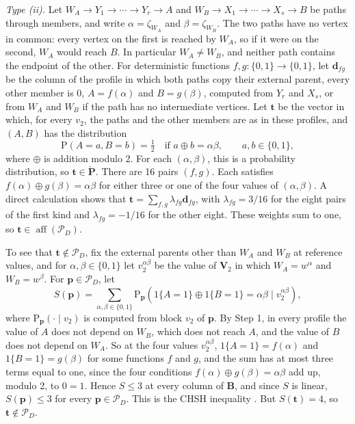 \documentclass[12pt]{article}
\def\Pr{{\mathrm{P}}}
\newcommand{\bV}{\boldsymbol{V}}
\begin{document}
\emph{Type (ii).} Let $W_A \rightarrow Y_1 \rightarrow \cdots \rightarrow Y_r \rightarrow A$ and $W_B \rightarrow X_1 \rightarrow \cdots \rightarrow X_s \rightarrow B$ be paths through members, and write $\alpha = \zeta_{W_A}$ and $\beta = \zeta_{W_B}$. The two paths have no vertex in common: every vertex on the first is reached by $W_A$, so if it were on the second, $W_A$ would reach $B$. In particular $W_A \neq W_B$, and neither path contains the endpoint of the other. For deterministic functions $f, g : \{0,1\} \to \{0,1\}$, let $\boldsymbol{d}_{fg}$ be the column of the profile in which both paths copy their external parent, every other member is $0$, $A = f(\alpha)$ and $B = g(\beta)$, computed from $Y_r$ and $X_s$, or from $W_A$ and $W_B$ if the path has no intermediate vertices. Let $\boldsymbol{t}$ be the vector in which, for every $v_2$, the paths and the other members are as in these profiles, and $(A, B)$ has the distribution
\[
\Pr(A = a, B = b) = \tfrac{1}{2} \quad \text{if } a \oplus b = \alpha\beta, \qquad a, b \in \{0, 1\},
\]
where $\oplus$ is addition modulo 2. For each $(\alpha, \beta)$, this is a probability distribution, so $\boldsymbol{t} \in \boldsymbol{\check{P}}$. There are 16 pairs $(f, g)$. Each satisfies $f(\alpha) \oplus g(\beta) = \alpha\beta$ for either three or one of the four values of $(\alpha, \beta)$. A direct calculation shows that $\boldsymbol{t} = \sum_{f,g} \lambda_{fg} \boldsymbol{d}_{fg}$, with $\lambda_{fg} = 3/16$ for the eight pairs of the first kind and $\lambda_{fg} = -1/16$ for the other eight. These weights sum to one, so $\boldsymbol{t} \in \operatorname{aff}(\mathcal{P}_D)$.

To see that $\boldsymbol{t} \notin \mathcal{P}_D$, fix the external parents other than $W_A$ and $W_B$ at reference values, and for $\alpha, \beta \in \{0, 1\}$ let $v_2^{\alpha\beta}$ be the value of $\bV_2$ in which $W_A = w^\alpha$ and $W_B = w^\beta$. For $\boldsymbol{p} \in \mathcal{P}_D$, let
\[
S(\boldsymbol{p}) = \sum_{\alpha, \beta \in \{0,1\}} \Pr_{\boldsymbol{p}}\left(1\{A = 1\} \oplus 1\{B = 1\} = \alpha\beta \mid v_2^{\alpha\beta}\right),
\]
where $\Pr_{\boldsymbol{p}}(\cdot \mid v_2)$ is computed from block $v_2$ of $\boldsymbol{p}$. By Step 1, in every profile the value of $A$ does not depend on $W_B$, which does not reach $A$, and the value of $B$ does not depend on $W_A$. So at the four values $v_2^{\alpha\beta}$, $1\{A = 1\} = f(\alpha)$ and $1\{B = 1\} = g(\beta)$ for some functions $f$ and $g$, and the sum has at most three terms equal to one, since the four conditions $f(\alpha) \oplus g(\beta) = \alpha\beta$ add up, modulo 2, to $0 = 1$. Hence $S \leq 3$ at every column of $\boldsymbol{B}$, and since $S$ is linear, $S(\boldsymbol{p}) \leq 3$ for every $\boldsymbol{p} \in \mathcal{P}_D$. This is the CHSH inequality \citep{clauser1969proposed}. But $S(\boldsymbol{t}) = 4$, so $\boldsymbol{t} \notin \mathcal{P}_D$.
\end{document}
